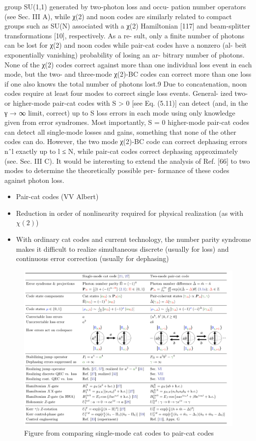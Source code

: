 \documentclass[12]{amsart}
\newcommand\0{\mathbf{0}}
\newcommand\<{\langle}
\renewcommand\>{\rangle}
\begin{document}
group SU(1,1) generated by two-photon loss and occu- pation number operators (see Sec. III A), while χ(2) and noon codes are similarly related to compact groups such as SU(N) associated with a χ(2) Hamiltonian [117] and beam-splitter transformations [10], respectively. As a re- sult, only a finite number of photons can be lost for χ(2) and noon codes while pair-cat codes have a nonzero (al- beit exponentially vanishing) probability of losing an ar- bitrary number of photons. None of the χ(2) codes correct against more than one individual loss event in each mode, but the two- and three-mode χ(2)-BC codes can correct more than one loss if one also knows the total number of photons lost.9 Due to concatenation, noon codes require at least four modes to correct single loss events. General- ized two- or higher-mode pair-cat codes with S > 0 [see Eq. (5.11)] can detect (and, in the γ → ∞ limit, correct) up to S loss errors in each mode using only knowledge given from error syndromes. Most importantly, S = 0 higher-mode pair-cat codes can detect all single-mode losses and gains, something that none of the other codes can do. However, the two mode χ(2)-BC code can correct dephasing errors nˆl exactly up to l ≤ N, while pair-cat codes correct dephasing approximately (see. Sec. III C). It would be interesting to extend the analysis of Ref. [66] to two modes to determine the theoretically possible per- formance of these codes against photon loss.


\begin{itemize}
		\item Pair-cat codes (VV Albert)
		\item Reduction in order of nonlinearity required for physical realization (as with $\chi(2)$)
		\item With ordinary cat codes and current technology, the number parity syndrome makes it difficult to realize simultaneous discrete (usually for loss) and continuous error correction  (usually for dephasing)
	\end{itemize}

\begin{figure}[H]
\centering
\includegraphics[width=\linewidth,keepaspectratio]{pair_cat.png}	
\caption{Figure from \cite{albert2018multimode} comparing single-mode cat codes to pair-cat codes}
\end{figure}
\end{document}
